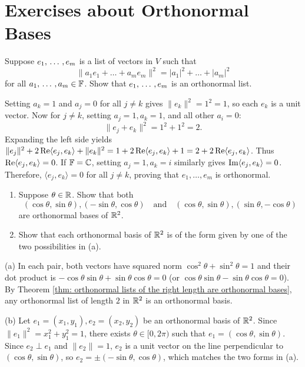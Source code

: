 \section*{Exercises about Orthonormal Bases}

\begin{xrcs}
  Suppose $e_1, {\, \ldots \,\,}, e_m$ is a list of vectors in $V$ such that
  \begin{equation}
    \|a_1 e_1 + \dots + a_m e_m\|^2 = |a_1|^2 + \dots + |a_m|^2
  \end{equation}
  for all $a_1, {\, \ldots \,\,}, a_m \in \mathbb{F}$. Show that $e_1, {\, \ldots \,\,}, e_m$ is an orthonormal list.

\begin{xprf}
  Setting $a_k = 1$ and $a_j = 0$ for all $j \neq k$ gives $\|e_k\|^2 = 1^2 = 1$, so each $e_k$ is a unit vector.
  Now for $j \neq k$, setting $a_j = 1, a_k = 1$, and all other $a_i = 0$:
  \[
    \|e_j + e_k\|^2 = 1^2 + 1^2 = 2.
  \]
  Expanding the left side yields $\|e_j\|^2 + 2\operatorname{Re}\langle e_j, e_k \rangle + \|e_k\|^2 = 1 + 2\operatorname{Re}\langle e_j, e_k \rangle + 1 = 2 + 2\operatorname{Re}\langle e_j, e_k \rangle$.
  Thus $\operatorname{Re}\langle e_j, e_k \rangle = 0$.
  If $\mathbb{F} = \mathbb{C}$, setting $a_j = 1, a_k = i$ similarly gives $\operatorname{Im}\langle e_j, e_k \rangle = 0$.
  Therefore, $\langle e_j, e_k \rangle = 0$ for all $j \neq k$, proving that $e_1, \dots, e_m$ is orthonormal.
\end{xprf}
\end{xrcs}

\begin{xrcs}
  \begin{enumerate}[label=\textbf{(\alph*)}]
    \item Suppose $\theta \in \mathbb{R}$. Show that both
    \[
      (\cos \theta, \sin \theta), (-\sin \theta, \cos \theta) \quad \text{and} \quad (\cos \theta, \sin \theta), (\sin \theta, -\cos \theta)
    \]
    are orthonormal bases of $\mathbb{R}^2$.
    \item Show that each orthonormal basis of $\mathbb{R}^2$ is of the form given by one of the two possibilities in (a).
  \end{enumerate}

\begin{xsol}
  \StepOne (a) In each pair, both vectors have squared norm $\cos^2\theta + \sin^2\theta = 1$ and their dot product is $-\cos\theta\sin\theta + \sin\theta\cos\theta = 0$ (or $\cos\theta\sin\theta - \sin\theta\cos\theta = 0$). By Theorem \ref{thm: orthonormal lists of the right length are orthonormal bases}, any orthonormal list of length $2$ in $\mathbb{R}^2$ is an orthonormal basis.

  \StepTwo (b) Let $e_1 = (x_1, y_1), e_2 = (x_2, y_2)$ be an orthonormal basis of $\mathbb{R}^2$. Since $\|e_1\|^2 = x_1^2 + y_1^2 = 1$, there exists $\theta \in [0, 2\pi)$ such that $e_1 = (\cos\theta, \sin\theta)$.
  Since $e_2 \perp e_1$ and $\|e_2\| = 1$, $e_2$ is a unit vector on the line perpendicular to $(\cos\theta, \sin\theta)$, so $e_2 = \pm(-\sin\theta, \cos\theta)$, which matches the two forms in (a).
\end{xsol}
\end{xrcs}

